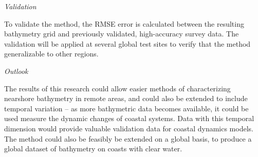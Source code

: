 \noindent\emph{Validation}

To validate the method, the RMSE error is calculated between the resulting bathymetry grid and previously validated, high-accuracy survey data. The validation will be applied at several global test sites to verify that the method generalizable to other regions.

\noindent\emph{Outlook} 

The results of this research could allow easier methods of characterizing nearshore bathymetry in remote areas, and could also be extended to include temporal variation – as more bathymetric data becomes available, it could be used measure the dynamic changes of coastal systems. Data with this temporal dimension would provide valuable validation data for coastal dynamics models. The method could also be feasibly be extended on a global basis, to produce a global dataset of bathymetry on coasts with clear water.
